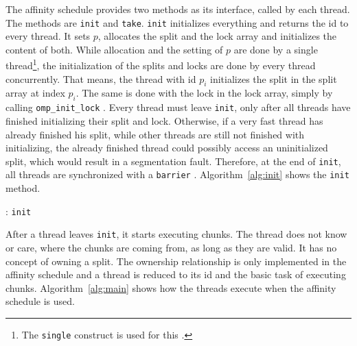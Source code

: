 \documentclass[twoside,11pt]{article}
\begin{document}
The affinity schedule provides two methods as its
interface, called by each thread.
The methods are \texttt{init} and \texttt{take}.
\texttt{init} initializes everything and returns the id
to every thread.
It sets $p$, allocates the split and the lock array and
initializes the content of both.
While allocation and the setting of $p$ are done by a
single thread\footnote{The \texttt{single} construct is
  used for this \citep[see][Chapter 2]{omp}.},
the initialization of the splits and locks
are done by every thread concurrently.
That means, the thread with id $p_i$ initializes the split
in the split array at index $p_i$.
The same is done with the lock in the lock array, simply
by calling \texttt{omp\_init\_lock}
\citep[see][Chapter 3]{omp}.
Every thread must leave \texttt{init}, only after all
threads have finished initializing their split and lock.
Otherwise, if a very fast thread has already finished his
split, while other threads are still not finished with
initializing, the already finished thread could possibly
access an uninitialized split, which would result in a
segmentation fault.
Therefore, at the end of \texttt{init}, all threads are
synchronized with a \texttt{barrier}
\citep[see][Chapter 2]{omp}.
Algorithm~\ref{alg:init} shows the \texttt{init} method.

\begin{algorithm}
  \caption{: \texttt{init}}
  \label{alg:init}

  \begin{algorithmic}[1]
    \ENDIF
  \end{algorithmic}
\end{algorithm}

After a thread leaves \texttt{init}, it starts executing
chunks.
The thread does not know or care, where the chunks are
coming from, as long as they are valid.
It has no concept of owning a split.
The ownership relationship is only implemented in the
affinity schedule and a thread is reduced to its id and
the basic task of executing chunks.
Algorithm~\ref{alg:main} shows how the threads execute
when the affinity schedule is used.
\end{document}
